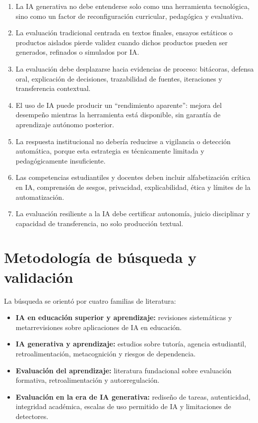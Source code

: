 \documentclass[
  spanish,
  letterpaper,
  DIV=11,
  numbers=noendperiod]{scrartcl}
\providecommand{\tightlist}{%
  \setlength{\itemsep}{0pt}\setlength{\parskip}{0pt}}
\begin{document}
\begin{enumerate}
\def\labelenumi{\arabic{enumi}.}
\tightlist
\item
  La IA generativa no debe entenderse solo como una herramienta
  tecnológica, sino como un factor de reconfiguración curricular,
  pedagógica y evaluativa.
\item
  La evaluación tradicional centrada en textos finales, ensayos
  estáticos o productos aislados pierde validez cuando dichos productos
  pueden ser generados, refinados o simulados por IA.
\item
  La evaluación debe desplazarse hacia evidencias de proceso: bitácoras,
  defensa oral, explicación de decisiones, trazabilidad de fuentes,
  iteraciones y transferencia contextual.
\item
  El uso de IA puede producir un ``rendimiento aparente'': mejora del
  desempeño mientras la herramienta está disponible, sin garantía de
  aprendizaje autónomo posterior.
\item
  La respuesta institucional no debería reducirse a vigilancia o
  detección automática, porque esta estrategia es técnicamente limitada
  y pedagógicamente insuficiente.
\item
  Las competencias estudiantiles y docentes deben incluir alfabetización
  crítica en IA, comprensión de sesgos, privacidad, explicabilidad,
  ética y límites de la automatización.
\item
  La evaluación resiliente a la IA debe certificar autonomía, juicio
  disciplinar y capacidad de transferencia, no solo producción textual.
\end{enumerate}

\section{Metodología de búsqueda y
validación}\label{metodologuxeda-de-buxfasqueda-y-validaciuxf3n}

La búsqueda se orientó por cuatro familias de literatura:

\begin{itemize}
\tightlist
\item
  \textbf{IA en educación superior y aprendizaje:} revisiones
  sistemáticas y metarrevisiones sobre aplicaciones de IA en educación.
\item
  \textbf{IA generativa y aprendizaje:} estudios sobre tutoría, agencia
  estudiantil, retroalimentación, metacognición y riesgos de
  dependencia.
\item
  \textbf{Evaluación del aprendizaje:} literatura fundacional sobre
  evaluación formativa, retroalimentación y autorregulación.
\item
  \textbf{Evaluación en la era de IA generativa:} rediseño de tareas,
  autenticidad, integridad académica, escalas de uso permitido de IA y
  limitaciones de detectores.
\end{itemize}
\end{document}
